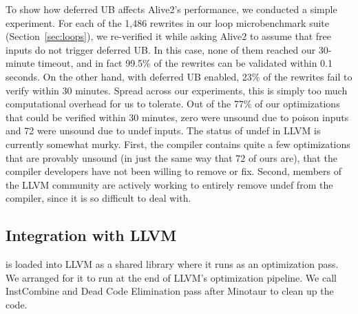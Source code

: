 To show how deferred UB affects Alive2's performance, we
conducted a simple experiment.
%
For each of the 1,486 rewrites in our loop microbenchmark suite
(Section~\ref{sec:loops}), we re-verified it while asking Alive2
to assume that free inputs do not trigger deferred UB\@.
%
In this case, none of them reached our 30-minute timeout, and in fact
99.5\% of the rewrites can be validated within 0.1 seconds.
%
On the other hand, with deferred UB enabled, 23\% of the rewrites fail
to verify within 30 minutes.
%
Spread across our experiments, this is simply too much computational
overhead for us to tolerate.
%
Out of the 77\% of our optimizations that could be verified within 30
minutes, zero were unsound due to poison inputs and 72 were unsound
due to undef inputs.
%
The status of undef in LLVM is currently somewhat murky.
%
First, the compiler contains quite a few optimizations that are
provably unsound (in just the same way that 72 of ours are), that the
compiler developers have not been willing to remove or fix.
%
Second, members of the LLVM community are actively working to entirely
remove undef from the compiler, since it is so difficult to deal with.

\fi


\iffalse
\begin{figure*}[tbp]
  \centering
  \begin{subfigure}[h]{0.45\textwidth}
    \texttt{[image: figures/data.pdf]}
    \caption{\footnotesize{with deferred UB, 347 cases exceeded resource limit}}
    \label{plot:reverify-undef}
  \end{subfigure}
  \begin{subfigure}[h]{0.45\textwidth}
    \texttt{[image: figures/data.pdf]}
    \caption{\footnotesize{without deferred UB}}
    \label{plot:reverify-no-undef}
  \end{subfigure}
  \caption{Time distribution for reverification}
\end{figure*}
\fi


\subsection{Integration with LLVM}

\tool{} is loaded into LLVM as a shared library where it runs as an
optimization pass.
%
We arranged for it to run at the end of LLVM's optimization pipeline.
%
We call InstCombine and Dead Code Elimination pass after Minotaur to
clean up the code.
